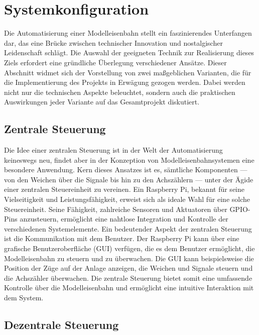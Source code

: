 \section{Systemkonfiguration}\label{text:Methodik:Systemkonfiguration}

Die Automatisierung einer Modelleisenbahn stellt ein faszinierendes Unterfangen dar, das eine Brücke zwischen technischer Innovation und nostalgischer Leidenschaft schlägt. Die Auswahl der geeigneten Technik zur Realisierung dieses Ziels erfordert eine gründliche Überlegung verschiedener Ansätze. Dieser Abschnitt widmet sich der Vorstellung von zwei maßgeblichen Varianten, die für die Implementierung des Projekts in Erwägung gezogen werden. Dabei werden nicht nur die technischen Aspekte beleuchtet, sondern auch die praktischen Auswirkungen jeder Variante auf das Gesamtprojekt diskutiert.

\subsection{Zentrale Steuerung}\label{text:Methodik:Systemkonfiguration:Zentrale-Steuerung}

Die Idee einer zentralen Steuerung ist in der Welt der Automatisierung keineswegs neu, findet aber in der Konzeption von Modelleisenbahnsystemen eine besondere Anwendung. Kern dieses Ansatzes ist es, sämtliche Komponenten --- von den Weichen über die Signale bis hin zu den Achszählern --- unter der Ägide einer zentralen Steuereinheit zu vereinen. Ein Raspberry Pi, bekannt für seine Vielseitigkeit und Leistungsfähigkeit, erweist sich als ideale Wahl für eine solche Steuereinheit. Seine Fähigkeit, zahlreiche Sensoren und Aktuatoren über GPIO-Pins anzusteuern, ermöglicht eine nahtlose Integration und Kontrolle der verschiedenen Systemelemente.
\newline
Ein bedeutender Aspekt der zentralen Steuerung ist die Kommunikation mit dem Benutzer. Der Raspberry Pi kann über eine grafische Benutzeroberfläche (GUI) verfügen, die es dem Benutzer ermöglicht, die Modelleisenbahn zu steuern und zu überwachen. Die GUI kann beispielsweise die Position der Züge auf der Anlage anzeigen, die Weichen und Signale steuern und die Achszähler überwachen. Die zentrale Steuerung bietet somit eine umfassende Kontrolle über die Modelleisenbahn und ermöglicht eine intuitive Interaktion mit dem System.

\subsection{Dezentrale Steuerung}\label{text:Methodik:Systemkonfiguration:Dezentrale-Steuerung}

